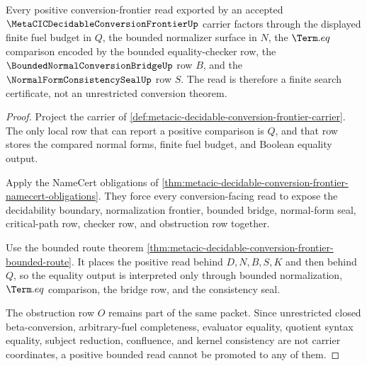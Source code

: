 \begin{theorem}
\label{thm:metacic-decidable-conversion-frontier-bounded-search}
Every positive conversion-frontier read exported by an accepted $\MetaCICDecidableConversionFrontierUp$ carrier factors through the displayed finite fuel budget in $Q$, the bounded normalizer surface in $N$, the $\Term.eq$ comparison encoded by the bounded equality-checker row, the $\BoundedNormalConversionBridgeUp$ row $B$, and the $\NormalFormConsistencySealUp$ row $S$. The read is therefore a finite search certificate, not an unrestricted conversion theorem.
\end{theorem}
\begin{proof}
Project the carrier of \autoref{def:metacic-decidable-conversion-frontier-carrier}. The only local row that can report a positive comparison is $Q$, and that row stores the compared normal forms, finite fuel budget, and Boolean equality output.

Apply the NameCert obligations of \autoref{thm:metacic-decidable-conversion-frontier-namecert-obligations}. They force every conversion-facing read to expose the decidability boundary, normalization frontier, bounded bridge, normal-form seal, critical-path row, checker row, and obstruction row together.

Use the bounded route theorem \autoref{thm:metacic-decidable-conversion-frontier-bounded-route}. It places the positive read behind $D,N,B,S,K$ and then behind $Q$, so the equality output is interpreted only through bounded normalization, $\Term.eq$ comparison, the bridge row, and the consistency seal.

The obstruction row $O$ remains part of the same packet. Since unrestricted closed beta-conversion, arbitrary-fuel completeness, evaluator equality, quotient syntax equality, subject reduction, confluence, and kernel consistency are not carrier coordinates, a positive bounded read cannot be promoted to any of them.
\end{proof}

